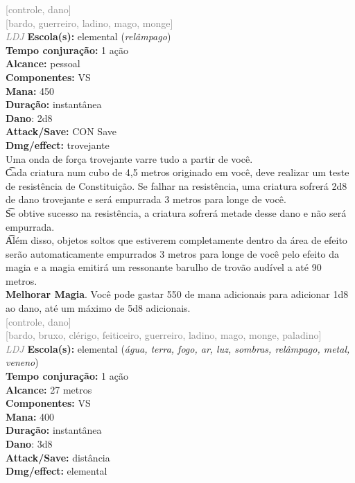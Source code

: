 \documentclass{RPG_Adventure}[2021/10/20]
\begin{document}
{\scriptsize \textcolor{gray}{[controle, dano]\\}}
{\scriptsize \textcolor{gray}{[bardo, guerreiro, ladino, mago, monge]\\}}
{\tiny \textcolor{gray}{\textit{LDJ}}}
{\small \t \textbf{Escola(s):} elemental (\textit{relâmpago})\\\t \textbf{Tempo conjuração:} 1 ação\\\t \textbf{Alcance:} pessoal\\\t \textbf{Componentes:} VS\\\t \textbf{Mana:} 450\\\t \textbf{Duração:} instantânea\\\t \textbf{Dano}: 2d8\\\t \textbf{Attack/Save:} CON Save\\\t \textbf{Dmg/effect:} trovejante\\}
{\normalsize Uma onda de força trovejante varre tudo a partir de você.\\\t Cada criatura num cubo de 4,5 metros originado em você, deve realizar um teste de resistência de Constituição. Se falhar na resistência, uma criatura sofrerá 2d8 de dano trovejante e será empurrada 3 metros para longe de você.\\\t Se obtive sucesso na resistência, a criatura sofrerá metade desse dano e não será empurrada.\\\t Além disso, objetos soltos que estiverem completamente dentro da área de efeito serão automaticamente empurrados 3 metros para longe de você pelo efeito da magia e a magia emitirá um ressonante barulho de trovão audível a até 90 metros.\\\t \textbf{Melhorar Magia}. Você pode gastar 550 de mana adicionais para adicionar 1d8 ao dano, até um máximo de 5d8 adicionais.\\}
{\scriptsize \textcolor{gray}{[controle, dano]\\}}
{\scriptsize \textcolor{gray}{[bardo, bruxo, clérigo, feiticeiro, guerreiro, ladino, mago, monge, paladino]\\}}
{\tiny \textcolor{gray}{\textit{LDJ}}}
{\small \t \textbf{Escola(s):} elemental (\textit{água, terra, fogo, ar, luz, sombras, relâmpago, metal, veneno})\\\t \textbf{Tempo conjuração:} 1 ação\\\t \textbf{Alcance:} 27 metros\\\t \textbf{Componentes:} VS\\\t \textbf{Mana:} 400\\\t \textbf{Duração:} instantânea\\\t \textbf{Dano}: 3d8\\\t \textbf{Attack/Save:} distância\\\t \textbf{Dmg/effect:} elemental\\}
\end{document}
